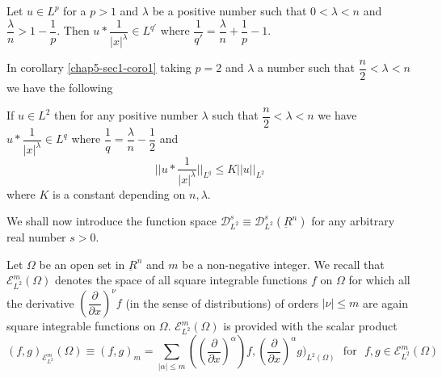 \setcounter{corollary}{0}
\begin{corollary}\label{chap5-sec1-coro1}  %
Let $u \in L^p$ for a $p > 1$ and $\lambda$ be a positive
number such that $0 < \lambda < n$ and $\dfrac{\lambda}{n} > 1 -
\dfrac{1}{p}$. Then $u * \dfrac{1}{|x|^\lambda}\in L^{q'}$ 
where $\dfrac{1}{q'} = \dfrac{\lambda}{n} + \dfrac{1}{p} - 1$.  
\end{corollary}

In corollary \ref{chap5-sec1-coro1} taking $p = 2$ and $\lambda$ a
number such that $\dfrac{n}{2} < \lambda < n$ we have the following  

\begin{corollary}\label{chap5-sec1-coro2}  %
If $u \in L^2$ then for any positive number $\lambda$ such
that $\dfrac{n}{2} < \lambda < n$ we have $u * \dfrac{1}{|x|^\lambda}
\in L^q$ where $\dfrac{1}{q} = \dfrac{\lambda}{n} -
\dfrac{1}{2}$ and  
\begin{equation*}
|| u * \frac{1}{|x|^\lambda} ||_{L^q} \leq K || u ||_{L^2}
\tag{1.3}\label{chap5-eq1.3} 
\end{equation*}
where $K$ is a constant depending on $n, \lambda$. 
\end{corollary} 
 
We shall now introduce the function space $\mathscr{D}^s_{L^2}\equiv
\mathscr{D}^s_{L^2} (\underbar{R}^n) $ for any arbitrary real number
$s > 0$.  
 
 Let $\Omega$ be an open set in $\underbar{R}^n$ and $m$ be a non-negative
 integer. We recall that $\mathscr{E}^m_{L^2} (\Omega)$ denotes the space
 of all square integrable functions $f$ on $\Omega$ for which all the
 derivative $\left(\dfrac{\partial}{\partial x}\right)^\nu  f$ 
(in the sense of distributions) of orders $|\nu|\leq m$ are again
 square integrable 
 functions on $\Omega$. $\mathscr{E}^m_{L^2} (\Omega)$ is provided
 with the scalar product  
{\fontsize{10pt}{12pt}\selectfont
 \begin{equation*}
(f, g )_{\mathscr{E}^m_{L^2}} (\Omega) \equiv (f, g)_m =
   \sum_{|\alpha|\leq m } \left(\left( \frac{\partial}{\partial
     x}\right)^\alpha \right) f, 
   \left(\frac{\partial}{\partial x}\right)^\alpha g)_{L^2 (\Omega)}
   \text{~ for~ } f, g \in \mathscr{E}^m_{L^2}(\Omega)
   \tag{1.4}\label{chap5-eq1.4}   
 \end{equation*}}\relax\pageoriginale 

